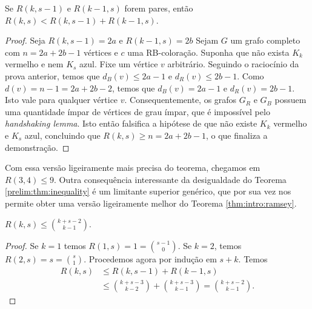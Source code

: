 \begin{theorem}
\label{prelim:thm:parity}
Se $R(k,s-1)$ e $R(k-1,s)$ forem pares, então
$R(k,s) < R(k,s-1) + R(k-1,s)$.
\end{theorem}
\begin{proof}
Seja $R(k,s-1) = 2a$ e $R(k-1,s) = 2b$
Sejam $G$ um grafo completo com $n = 2a + 2b -1$ vértices e $c$ uma RB-coloração. Suponha que não exista $K_k$ vermelho e nem $K_s$ azul. Fixe um vértice $v$ arbitrário. Seguindo o raciocínio da prova anterior, temos que $d_B(v) \leq 2a - 1$ e $d_R(v) \leq 2b - 1$. Como $d(v) = n - 1 = 2a + 2b - 2$, temos que $d_B(v) = 2a - 1$ e $d_R(v) = 2b - 1$. Isto vale para qualquer vértice $v$.
Consequentemente, os grafos $G_R$ e $G_B$ possuem uma quantidade ímpar de vértices de grau ímpar, que é impossível pelo \emph{handshaking lemma}. Isto então falsifica a hipótese de que não existe $K_k$ vermelho e $K_s$ azul, concluindo que $R(k,s) \geq n = 2a + 2b -1$, o que finaliza a demonstração.
\end{proof}

Com essa versão ligeiramente mais precisa do teorema, chegamos em $R(3,4) \leq 9$. Outra consequência interessante da desigualdade do Teorema \ref{prelim:thm:inequality} é um limitante superior genérico, que por sua vez nos permite obter uma versão ligeiramente melhor do Teorema \ref{thm:intro:ramsey}.

\begin{theorem}
\label{thm:szekeres}
$\displaystyle R(k,s) \leq \binom{k + s - 2}{k - 1}$.
\end{theorem}
\begin{proof}
Se $k = 1$ temos $R(1,s) = 1 = \binom{s - 1}{0}$. Se $k = 2$, temos $R(2,s) = s = \binom{s}{1}$. Procedemos agora por indução em $s + k$. Temos
\begin{align*}
  R(k,s) &\leq R(k,s-1) + R(k-1,s) \\
  &\leq \binom{k + s - 3}{k - 2} + \binom{k + s - 3}{k - 1} = \binom{k + s - 2}{k - 1}.
\end{align*}
\end{proof}

